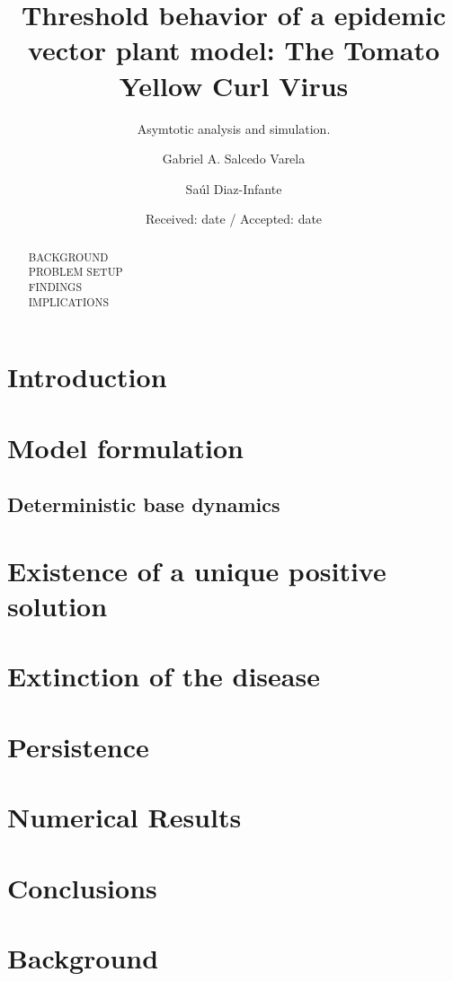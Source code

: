 \documentclass[smallextended]{svjour3}
\begin{document}
	\title{%
		Threshold behavior of a epidemic vector plant model:
		The Tomato Yellow Curl Virus
	}
	\subtitle{%
		Asymtotic analysis and simulation.
	}
	\author{Gabriel A. Salcedo Varela  \and Sa\'ul Diaz-Infante }
	\date{Received: date / Accepted: date}
	\maketitle
	\begin{abstract}
		BACKGROUND
		\\
		PROBLEM SETUP
		\\
		FINDINGS 
		\\
		IMPLICATIONS
	\end{abstract}
	\section{Introduction}
	\section{Model formulation}
		\subsection{Deterministic base dynamics}
		
	
	
	\section{Existence of a unique positive solution}
		
	\section{Extinction of the disease}
		
		
	\section{Persistence}
	
	\section{Numerical Results}
	\section{Conclusions}
	
	\appendix
	\section{Background}
\end{document}
